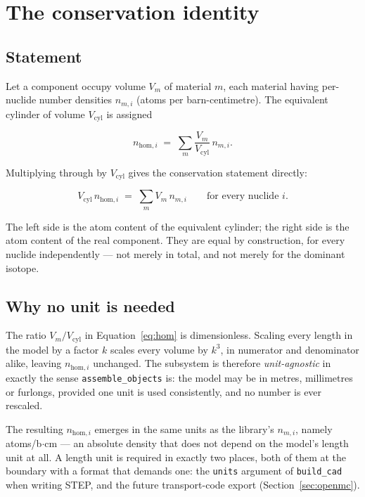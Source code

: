 \documentclass[9pt,a4paper]{extarticle}
\newcommand{\code}[1]{\texttt{\small #1}}
\begin{document}
\section{The conservation identity}
\label{sec:units}

\subsection{Statement}

Let a component occupy volume $V_m$ of material $m$, each material having
per-nuclide number densities $n_{m,i}$ (atoms per barn-centimetre). The
equivalent cylinder of volume $V_{\mathrm{cyl}}$ is assigned

\begin{equation}
n_{\mathrm{hom},i} \;=\; \sum_m \frac{V_m}{V_{\mathrm{cyl}}}\, n_{m,i} .
\label{eq:hom}
\end{equation}

\noindent
Multiplying through by $V_{\mathrm{cyl}}$ gives the conservation statement
directly:

\begin{equation}
V_{\mathrm{cyl}}\, n_{\mathrm{hom},i} \;=\; \sum_m V_m\, n_{m,i}
\qquad \text{for every nuclide } i .
\label{eq:cons}
\end{equation}

\noindent
The left side is the atom content of the equivalent cylinder; the right side is
the atom content of the real component. They are equal by construction, for
every nuclide independently --- not merely in total, and not merely for the
dominant isotope.

\subsection{Why no unit is needed}

The ratio $V_m/V_{\mathrm{cyl}}$ in Equation~\ref{eq:hom} is dimensionless.
Scaling every length in the model by a factor $k$ scales every volume by $k^3$,
in numerator and denominator alike, leaving $n_{\mathrm{hom},i}$ unchanged.
The subsystem is therefore \emph{unit-agnostic} in exactly the sense
\code{assemble\_objects} is: the model may be in metres, millimetres or
furlongs, provided one unit is used consistently, and no number is ever
rescaled.

The resulting $n_{\mathrm{hom},i}$ emerges in the same units as the library's
$n_{m,i}$, namely atoms/b$\cdot$cm --- an absolute density that does not depend
on the model's length unit at all. A length unit is required in exactly two
places, both of them at the boundary with a format that demands one: the
\code{units} argument of \code{build\_cad} when writing STEP, and the future
transport-code export (Section~\ref{sec:openmc}).
\end{document}
